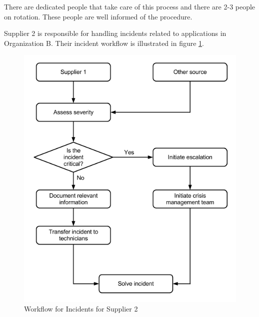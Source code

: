 There are dedicated people that take care of this process and there are 2-3 people on rotation. These people are well informed of the procedure.  


Supplier 2 is responsible for handling incidents related to applications in Organization B. Their incident workflow is illustrated in figure \ref{fig:WorkflowCaseBSupplier2}.

\begin{figure}[H]
\begin{center}
\includegraphics[scale=0.54]{WorkflowCaseBSupplier2.png}
\caption[Workflow for Incidents, Case B Supplier 2]{Workflow for Incidents for Supplier 2}
\label{fig:WorkflowCaseBSupplier2}
\end{center}
\end{figure}

